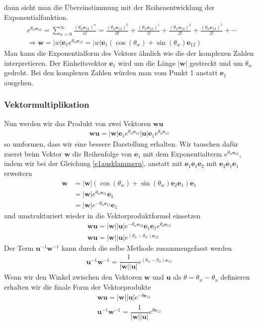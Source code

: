 dann sieht man die Übereinstimmung mit der Reihenentwicklung der Exponentialfunktion.
\begin{align}
	&e^{\theta_w\mathbf{e}_{12}}=\sum _{n=0}^{\infty }{\frac {(\theta_w\mathbf{e}_{12})^{n}}{n!}}={\frac {(\theta_w\mathbf{e}_{12})^{0}}{0!}}+{\frac {(\theta_w\mathbf{e}_{12})^{1}}{1!}}+{\frac {(\theta_w\mathbf{e}_{12})^{2}}{2!}}+{\frac {(\theta_w\mathbf{e}_{12})^{3}}{3!}}+\cdots\\
	&\Rightarrow \mathbf{w} = |w|\mathbf{e}_1 e^{\theta_w \mathbf{e}_{12}} = |w|\mathbf{e}_1\left(\cos(\theta_w)+ \sin(\theta_w) \mathbf{e}_{12}\right)
\end{align}
Man kann die Exponentialform des Vektors ähnlich wie die der komplexen Zahlen interpretieren. Der Einheitsvektor $\mathbf{e}_1$ wird um die Länge $|\mathbf{w}|$ gestreckt und um $\theta_w$ gedreht.
Bei den komplexen Zahlen würden man vom Punkt 1 anstatt $\mathbf{e}_1$ ausgehen.
\subsubsection{Vektormultiplikation}
Nun werden wir das Produkt von zwei Vektoren $\mathbf{wu}$
\begin{align}
	\mathbf{wu} = |\mathbf{w}|\mathbf{e}_1 e^{\theta_w \mathbf{e}_{12}}|\mathbf{u}|\mathbf{e}_1 e^{\theta_u \mathbf{e}_{12}}
\end{align}
so umformen, dass wir eine bessere Darstellung erhalten. Wir tauschen dafür zuerst beim Vektor $\mathbf{w}$ die Reihenfolge von 
$\mathbf{e}_1$ mit dem Exponentialterm $e^{\theta_w \mathbf{e}_{12}}$, indem wir bei der Gleichung \eqref{e1ausklammern}, anstatt mit $\mathbf{e}_1\mathbf{e}_1\mathbf{e}_2$ mit $\mathbf{e}_2\mathbf{e}_1\mathbf{e}_1$ erweitern
\begin{align} 
	\mathbf{w} &= |\mathbf{w}|\left(\cos(\theta_w)+ \sin(\theta_w) \mathbf{e}_2\mathbf{e}_1\right)\mathbf{e}_1\\
	&= |\mathbf{w}|e^{\theta_w \mathbf{e}_{21}}\mathbf{e}_1\\
	&= |\mathbf{w}|e^{-\theta_w \mathbf{e}_{12}}\mathbf{e}_1
\end{align}
und umstrukturiert wieder in die Vektorproduktformel einsetzen
\begin{align}
	\mathbf{wu} = |\mathbf{w}||\mathbf{u}|e^{-\theta_w \mathbf{e}_{12}}\mathbf{e}_1\mathbf{e}_1 e^{\theta_u \mathbf{e}_{12}}\\
	\mathbf{wu} = |\mathbf{w}||\mathbf{u}|e^{(\theta_u-\theta_w) \mathbf{e}_{12}}
\end{align}
Der Term $\mathbf{u}^{-1}\mathbf{w}^{-1}$ kann durch die selbe Methode zusammengefasst werden
\begin{align}
	\mathbf{u}^{-1}\mathbf{w}^{-1} = \dfrac{1}{|\mathbf{w}||\mathbf{u}|}e^{(\theta_w-\theta_u) \mathbf{e}_{12}}
\end{align}
Wenn wir den Winkel zwischen den Vektoren  $\mathbf{w}$ und $\mathbf{u}$ als $\theta = \theta_w - \theta_u$ definieren erhalten wir die finale Form der Vektorprodukte
\begin{align}
	\mathbf{wu} = |\mathbf{w}||\mathbf{u}|e^{-\theta \mathbf{e}_{12}}\\
	\mathbf{u}^{-1}\mathbf{w}^{-1} = \dfrac{1}{|\mathbf{w}||\mathbf{u}|}e^{\theta \mathbf{e}_{12}}
\end{align}
